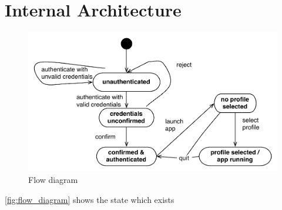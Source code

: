 \section{Internal Architecture}



\begin{figure}[h]
	\centering
	\includegraphics[width=1\textwidth]{gfx/flow-diagram2.pdf}
	\caption{Flow diagram}
	\label{fig:flow_diagram}
\end{figure}

\autoref{fig:flow_diagram} shows the state which exists 